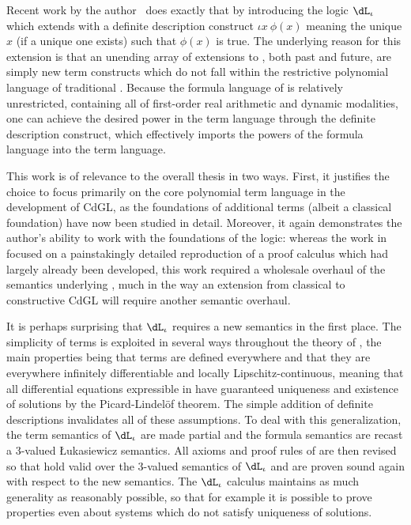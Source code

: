 \documentclass[12pt]{cmuthesis}
\theoremstyle{definition}
\theoremstyle{remark}
\newcommand{\meps}[2]{\iota{#1}~{#2}}
\newcommand{\rref}[2][]{\prettyref{#2}}
\newcommand{\CdGL}{\textsf{CdGL}\xspace}
\newcommand{\dLi}{\ensuremath{\dL_\iota}\xspace}
\begin{document}
Recent work by the author~\cite{DBLP:conf/cade/BohrerFP19} does exactly that by introducing the logic \dLi which extends \dL with a definite description construct $\meps{x}{\phi(x)}$ meaning the unique $x$ (if a unique one exists) such that $\phi(x)$ is true.
The underlying reason for this extension is that an unending array of extensions to \dL, both past and future, are simply new term constructs which do not fall within the restrictive polynomial language of traditional \dL.
Because the formula language of \dL is relatively unrestricted, containing all of first-order real arithmetic and dynamic modalities, one can achieve the desired power in the term language through the definite description construct, which effectively imports the powers of the formula language into the term language.

This work is of relevance to the overall thesis in two ways.
First, it justifies the choice to focus primarily on the core polynomial term language in the development of \CdGL, as the foundations of additional terms (albeit a classical foundation) have now been studied in detail.
Moreover, it again demonstrates the author's ability to work with the foundations of the logic: whereas the work in \rref{sec:isabelle-fml} focused on a painstakingly detailed reproduction of a proof calculus which had largely already been developed, this work required a wholesale overhaul of the semantics underlying \dL, much in the way an extension from classical \dGL to constructive \CdGL will require another semantic overhaul.

It is perhaps surprising that \dLi requires a new semantics in the first place.
The simplicity of \dL terms is exploited in several ways throughout the theory of \dL, the main properties being that terms are defined everywhere and that they are everywhere infinitely differentiable and locally Lipschitz-continuous, meaning that all differential equations expressible in \dL have guaranteed uniqueness and existence of solutions by the Picard-Lindel\"of theorem.
The simple addition of definite descriptions invalidates all of these assumptions.
To deal with this generalization, the term semantics of \dLi are made partial and the formula semantics are recast a 3-valued {\L}ukasiewicz semantics.
All axioms and proof rules of \dL are then revised so that hold valid over the 3-valued semantics of \dLi and are proven sound again with respect to the new semantics.
The \dLi calculus maintains as much generality as reasonably possible, so that for example it is possible to prove properties even about systems which do not satisfy uniqueness of solutions.
\end{document}
